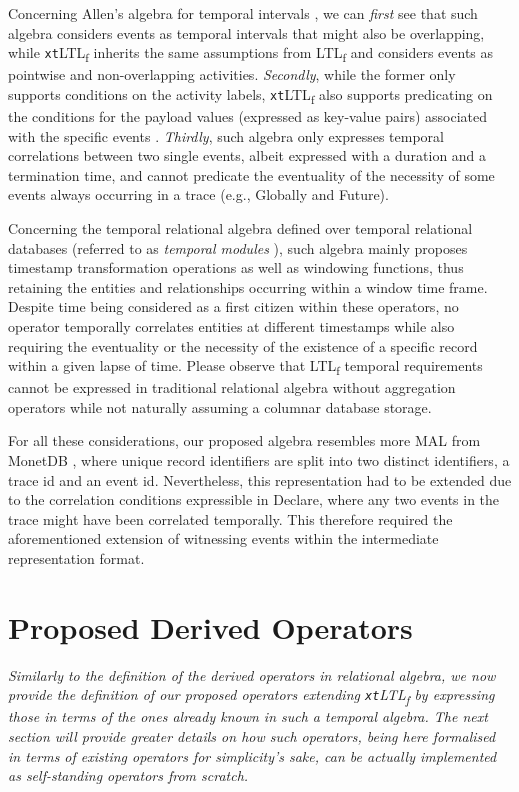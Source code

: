 \documentclass[sigconf]{acmart}
\begin{document}
Concerning Allen's algebra for temporal intervals \cite{10.1145/182.358434}, we can \textit{first} see that such algebra considers events as temporal intervals that might also be overlapping, while \texttt{xt}LTL\textsubscript{f} inherits the same assumptions from LTL\textsubscript{f} and considers events as pointwise and non-overlapping activities. \textit{Secondly}, while the former only supports conditions on the activity labels, \texttt{xt}LTL\textsubscript{f} also supports predicating on the conditions for the payload values (expressed as key-value pairs) associated with the specific events \cite{info14030173}. \textit{Thirdly}, such algebra only expresses temporal correlations between two single events, albeit expressed with a duration and a termination time, and cannot predicate the eventuality of the necessity of some events always occurring in a trace (e.g., Globally and Future). 

Concerning the temporal relational algebra \cite{DBLP:conf/cikm/Wang95} defined over temporal relational databases (referred to as \textit{temporal modules} \cite{DBLP:journals/isci/WangJS95}),  such algebra mainly proposes timestamp transformation operations as well as windowing functions, thus retaining the entities and relationships occurring within a window time frame. Despite time being considered as a first citizen within these operators, no operator temporally correlates entities at different timestamps while also requiring the eventuality or the necessity of the existence of a specific record within a given lapse of time. Please observe that LTL\textsubscript{f} temporal requirements cannot be expressed in traditional relational algebra without aggregation operators while not naturally assuming a columnar database storage.

For all these considerations, our proposed algebra resembles more MAL from MonetDB \cite{IdreosGNMMK12}, where unique record identifiers are split into two distinct identifiers, a trace id and an event id. Nevertheless, this representation had to be extended due to the correlation conditions expressible in Declare, where any two events in the trace might have been correlated temporally. This therefore required the aforementioned extension of witnessing events within the intermediate representation format.



\section{Proposed Derived Operators}\label{sec:opdef}
\textit{Similarly to the definition of the derived operators in relational algebra, we now provide the definition of our proposed operators extending \texttt{xt}LTL\textsubscript{f} by expressing those in terms of the ones already known in such a temporal algebra. The next section will provide greater details on how such operators, being here formalised in terms of existing operators for simplicity's sake, can be actually implemented as self-standing operators from scratch.}
\medskip
\end{document}
